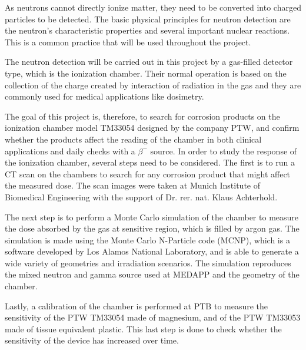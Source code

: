 As neutrons cannot directly ionize matter, they need to be converted into charged particles to be detected. The basic physical principles for neutron detection are the neutron’s characteristic properties and several important nuclear reactions. This is a common practice that will be used throughout the project.

The neutron detection will be carried out in this project by a gas-filled detector type, which is the ionization chamber. Their normal operation is based on the collection of the charge created by interaction of radiation in the gas and they are commonly used for medical applications like dosimetry.

The goal of this project is, therefore, to search for corrosion products on the ionization chamber model TM33054 designed by the company PTW, and confirm whether the products affect the reading of the chamber in both clinical applications and daily checks with a $\beta^-$ source. In order to study the response of the ionization chamber, several steps need to be considered. The first is to run a CT scan on the chambers to search for any corrosion product that might affect the measured dose. The scan images were taken at Munich Institute of Biomedical Engineering with the support of Dr. rer. nat. Klaus Achterhold.

The next step is to perform a Monte Carlo simulation of the chamber to measure the dose absorbed by the gas at sensitive region, which is filled by argon gas. The simulation is made using the Monte Carlo N-Particle code (MCNP), which is a software developed by Los Alamos National Laboratory, and is able to generate a wide variety of geometries and irradiation scenarios. The simulation reproduces the mixed neutron and gamma source used at MEDAPP and the geometry of the chamber.

Lastly, a calibration of the chamber is performed at PTB to measure the sensitivity of the PTW TM33054 made of magnesium, and of the PTW TM33053 made of tissue equivalent plastic. This last step is done to check whether the sensitivity of the device has increased over time.